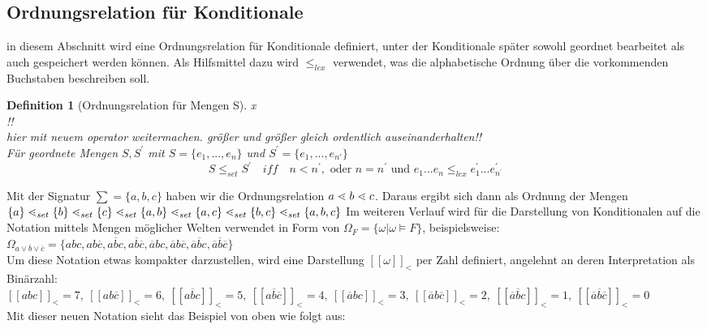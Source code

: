 \documentclass[12pt,a4paper]{article}
\newtheorem{theorem}{Definition}
\newcommand\dotl{\mathrel{%
    \mathchoice{\QEQ}{\QEQ}{\scriptsize\QEQ}{\tiny\QEQ}%
}}
\def\QEQ{{%
    \setbox0\hbox{<}%
    \rlap{\hbox to \wd0{\hss$\ \cdot$\hss}}\box0
}}
\begin{document}
\subsection{Ordnungsrelation für Konditionale}
in diesem Abschnitt wird eine Ordnungsrelation für Konditionale definiert, unter der Konditionale später sowohl geordnet bearbeitet als auch gespeichert werden können. Als Hilfsmittel dazu wird $\leq_{lex}$ verwendet, was die alphabetische Ordnung über die vorkommenden Buchstaben beschreiben soll.
\begin{theorem}[Ordnungsrelation für Mengen S]
x\\!! \\hier mit neuem operator weitermachen. größer und größer gleich ordentlich auseinanderhalten!!\\
Für geordnete Mengen $S, S^\prime$ mit $S = \{e_1, ..., e_n\}$ und $S^\prime = \{e_{1}, ... , e_{n\prime}\}$
\begin{equation}
 S \leq_{set} S ^\prime \quad iff \quad n<n^\prime, \text{ oder } n = n ^\prime \text{ und } e_1...e_n  \leq_{lex}  e_1^\prime ... e_{n^\prime}^\prime
\end{equation}
\end{theorem}
Mit der Signatur $\sum = \{ a, b, c\}$ haben wir die Ordnungsrelation $a \dotl b \dotl c$. Daraus ergibt sich dann als Ordnung  der Mengen $\{a\} \dotl_{set} \{b\} \dotl_{set} \{c\} \dotl_{set} \{a,b\} \dotl_{set} \{a,c\} \dotl_{set}\{b,c\} \dotl_{set} \{a, b, c\}$
Im weiteren Verlauf wird für die Darstellung von Konditionalen auf die Notation mittels Mengen möglicher Welten verwendet in Form von $\Omega_F = \{\omega | \omega \models F \}$, beispielsweise: \\
$\Omega_{a\vee\overline{b}\vee \overline{c}} = \{abc,ab\overline{c},a\overline{b}c,a\overline{b}\overline{c},\overline{a}bc,\overline{a}b\overline{c},\overline{a}\overline{b}c,\overline{a}\overline{b}\overline{c}\}$ \\
Um diese Notation etwas kompakter darzustellen, wird eine Darstellung $[[\omega]]_<$ per Zahl definiert, angelehnt an deren Interpretation als Binärzahl: \\
$[[abc]]_<  = 7,\ 
[[ab\overline{c}]]_< = 6,\ 
[[a\overline{b}c]]_< = 5,\ 
[[a\overline{b}\overline{c}]]_< = 4 ,\
[[\overline{a}bc]]_< = 3,\ 
[[\overline{a}b\overline{c}]]_< = 2 ,\  
[[\overline{a}\overline{b}c]]_<  = 1,\ 
[[\overline{a}\overline{b}\overline{c}]]_< = 0 $ \\
Mit dieser neuen Notation sieht das Beispiel von oben wie folgt aus: \\
\end{document}
